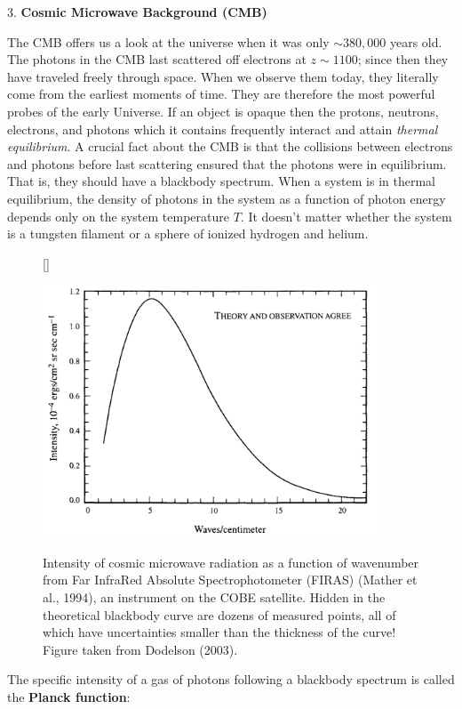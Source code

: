 \documentclass[a4paper,11pt]{article}
\begin{document}
{\noindent}3. \textbf{Cosmic Microwave Background (CMB)}

{\noindent}The CMB offers us a look at the universe when it was only $\sim 380,000$ years old. The photons in the CMB last scattered off electrons at $z \sim 1100$; since then they have traveled freely through space. When we observe them today, they literally come from the earliest moments of time. They are therefore the most powerful probes of the early Universe. If an object is opaque then the protons, neutrons, electrons, and photons which it contains frequently interact and attain \textit{thermal equilibrium}. A crucial fact about the CMB is that the collisions between electrons and photons before last scattering ensured that the photons were in equilibrium. That is, they should have a blackbody spectrum. When a system is in thermal equilibrium, the density of photons in the system as a function of photon energy depends only on the system temperature $T$. It doesn't matter whether the system is a tungsten filament or a sphere of ionized hydrogen and helium.

\begin{figure}[h]
    [\FBwidth]
    {\caption{\footnotesize{Intensity of cosmic microwave radiation as a function of wavenumber from Far InfraRed Absolute Spectrophotometer (FIRAS) (Mather et al., 1994), an instrument on the COBE satellite. Hidden in the theoretical blackbody curve are dozens of measured points, all of which have uncertainties smaller than the thickness of the curve! Figure taken from Dodelson (2003).}}
    \label{fig:cmb_cobe}}
    {\includegraphics[width=10cm]{figures/CMB_COBE.png}}
\end{figure}

{\noindent}The specific intensity of a gas of photons following a blackbody spectrum is called the \textbf{Planck function}:
\end{document}
